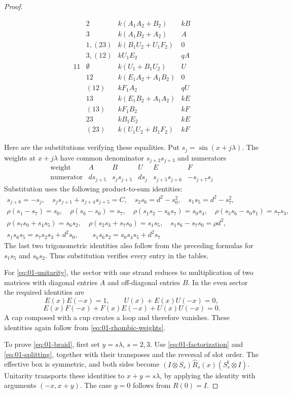 \begin{proof}
\begin{samepage}
\[\begin{array}{c|c|c|c}
&2&k(A_1 A_2+B_2)& k B\\
&3&k(A_1 B_2+A_2)& A\\
&1,(23)& k(B_1 U_2+U_1 F_2)&0\\
&3,(12)& k U_1 E_2 & q A\\\hline
11&\emptyset&k(U_1+B_1 U_2)& U\\
&12& k(E_1 A_2+A_1 B_2)&0\\
&(12)& k F_1 A_2 &q U\\
&13& k(E_1 B_2+A_1 A_2)& k E\\
&(13)& k F_1 B_2&k F\\
&23& k B_1 E_2&k E\\
&(23)&k(U_1 U_2+B_1 F_2)& k F
\end{array}
\]
\end{samepage}
Here are the substitutions verifying these equalities. Put
$s_j=\sin(x+j\lambda)$. The weights at $x+j\lambda$ have common
denominator $s_{j+2}s_{j+3}$ and numerators
\[
\begin{array}{c|ccccc}
\text{weight}&A&B&U&E&F\\\hline
\text{numerator}&d s_{j+5}&s_j s_{j+5}&d s_j&
 s_{j+5}s_{j+6}&-s_{j+7}s_j
\end{array}
\]
Substitution uses the following product-to-sum identities:
\[
\begin{gathered}
s_{j+8}=-s_j,\quad s_j s_{j+1}+s_{j+4}s_{j+5}=C,\quad
s_2s_6=d^2-s_0^2,\quad s_1s_5=d^2-s_7^2,\\
\rho(s_1-s_7)=s_0,\quad \rho(s_6-s_0)=s_7,\quad
\rho(s_1s_2-s_6s_7)=s_0s_4,\quad \rho(s_5s_6-s_0s_1)=s_7s_3,\\
\rho(s_7s_0+s_4s_5)=s_6s_2,\quad \rho(s_2s_3+s_7s_0)=s_1s_5,\quad
s_1s_6-s_7s_0=\rho d^2,\\
s_1s_6s_5=s_7s_2s_3+d^2s_0,\qquad s_1s_6s_2=s_0s_4s_5+d^2s_7
\end{gathered}
\]
The last two trigonometric identities also follow from the preceding
formulas for $s_1s_5$ and $s_6s_2$. Thus substitution verifies every
entry in the tables.

For \eqref{eq:01-unitarity}, the sector with one strand reduces to
multiplication of two matrices with diagonal entries $A$ and
off-diagonal entries $B$. In the even sector the required identities
are
\[
 E(x)E(-x)=1,\qquad U(x)+E(x)U(-x)=0,
\]
\[
 E(x)F(-x)+F(x)E(-x)+U(x)U(-x)=0.
\]
A cap composed with a cup creates a loop and therefore vanishes.
These identities again follow from \eqref{eq:01-rhombic-weights}.

To prove \eqref{eq:01-braid}, first set $y=s\lambda$, $s=2,3$.
Use \eqref{eq:01-factorization} and \eqref{eq:01-splitting}, together
with their transposes and the reversal of slot order. The effective
box is symmetric, and both sides become
$(I\otimes S_s)\widehat R_s(x)(S_s^{\mathsf t}\otimes I)$.
Unitarity transports these identities to $x+y=s\lambda$, by applying
the identity with arguments $(-x,x+y)$. The case $y=0$ follows from
$R(0)=I$.


\end{proof}
